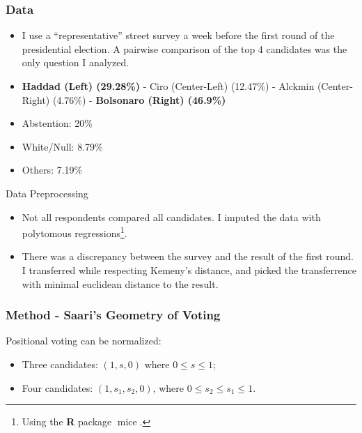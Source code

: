 \documentclass{beamer}
\begin{document}
\begin{frame}
  \frametitle{Data}
  \begin{itemize}
    \item I use a ``representative'' street survey a week before the first round
          of the presidential election. A pairwise comparison of the top 4
          candidates was the only question I analyzed.
    \item \textbf{Haddad (Left) (29.28\%)} - Ciro (Center-Left) (12.47\%) -
          Alckmin (Center-Right) (4.76\%) - \textbf{Bolsonaro (Right) (46.9\%)}
          \item Abstention: 20\%
          \item White/Null: 8.79\%
          \item Others: 7.19\%
  \end{itemize}
\end{frame}

\begin{frame}{Data Preprocessing}
  \begin{itemize}
    \item Not all respondents compared all candidates. I imputed the data with polytomous regressions\footnote{Using the \textbf{\textsf{R}} package
          \(\operatorname{mice}.\)}.
    \item There was a discrepancy between the survey and the result of the first
          round. I transferred while respecting Kemeny's distance, and picked
          the transferrence with minimal euclidean distance to the result.
  \end{itemize}
\end{frame}
\begin{frame}
  \frametitle{Method - Saari's Geometry of Voting }

     Positional voting can be normalized:
    \begin{itemize}
      \item Three candidates: \((1,s,0)\) where \(0 \leq s \leq 1\);
      \item Four candidates: \((1,s_{1},s_{2},0)\),
            where \(0 \leq s_{2} \leq s_{1} \leq 1\).
    \end{itemize}
  \end{frame}
\end{document}
